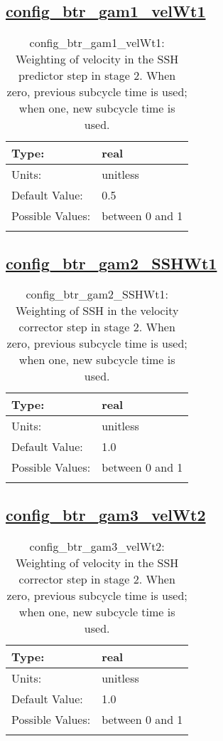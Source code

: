 \subsection[config\_btr\_gam1\_velWt1]{\hyperref[sec:nm_tab_split_explicit_ts]{config\_btr\_gam1\_velWt1}}
\label{subsec:nm_sec_config_btr_gam1_velWt1}
\begin{center}
\begin{longtable}{| p{2.0in} || p{4.0in} |}
    \hline
    Type: & real \\
    \hline
    Units: & \si{unitless} \\
    \hline
    Default Value: & 0.5 \\
    \hline
    Possible Values: & between 0 and 1 \\
    \hline
    \caption{config\_btr\_gam1\_velWt1: Weighting of velocity in the SSH predictor step in stage 2. When zero, previous subcycle time is used; when one, new subcycle time is used.}
\end{longtable}
\end{center}
\subsection[config\_btr\_gam2\_SSHWt1]{\hyperref[sec:nm_tab_split_explicit_ts]{config\_btr\_gam2\_SSHWt1}}
\label{subsec:nm_sec_config_btr_gam2_SSHWt1}
\begin{center}
\begin{longtable}{| p{2.0in} || p{4.0in} |}
    \hline
    Type: & real \\
    \hline
    Units: & \si{unitless} \\
    \hline
    Default Value: & 1.0 \\
    \hline
    Possible Values: & between 0 and 1 \\
    \hline
    \caption{config\_btr\_gam2\_SSHWt1: Weighting of SSH in the velocity corrector step in stage 2. When zero, previous subcycle time is used; when one, new subcycle time is used.}
\end{longtable}
\end{center}
\subsection[config\_btr\_gam3\_velWt2]{\hyperref[sec:nm_tab_split_explicit_ts]{config\_btr\_gam3\_velWt2}}
\label{subsec:nm_sec_config_btr_gam3_velWt2}
\begin{center}
\begin{longtable}{| p{2.0in} || p{4.0in} |}
    \hline
    Type: & real \\
    \hline
    Units: & \si{unitless} \\
    \hline
    Default Value: & 1.0 \\
    \hline
    Possible Values: & between 0 and 1 \\
    \hline
    \caption{config\_btr\_gam3\_velWt2: Weighting of velocity in the SSH corrector step in stage 2. When zero, previous subcycle time is used; when one, new subcycle time is used.}
\end{longtable}
\end{center}

